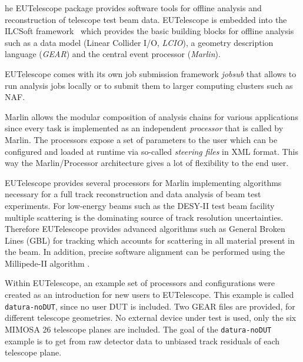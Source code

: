 

he EUTelescope package \cite{ref:eutelwebsite} provides software tools for offline analysis and reconstruction of telescope test beam data. 
EUTelescope is embedded into the ILCSoft framework~\cite{ref:eudetmemo_2009_12} which provides the basic building blocks for offline analysis such as a data model (Linear Collider I/O, \emph{LCIO}),
a geometry description language (\emph{GEAR}) and the central event processor (\emph{Marlin}).


EUTelescope comes with its own job submission framework \emph{jobsub} that allows to run analysis jobs locally or to submit them to larger computing clusters such as NAF.

Marlin allows the modular composition of analysis chains for various applications since every task is implemented as an independent \emph{processor} that is called by Marlin. 
The processors expose a set of parameters to the user which can be configured and loaded at runtime via so-called \emph{steering files} in XML format.
This way the Marlin/Processor architecture gives a lot of flexibility to the end user. 

EUTelescope provides several processors for Marlin implementing algorithms necessary for a full track reconstruction and data analysis of beam test experiments. 
For low-energy beams such as the DESY-II test beam facility multiple scattering is the dominating source of track resolution uncertainties. 
Therefore EUTelescope provides advanced algorithms such as General Broken Lines (GBL) \cite{Kleinwort-2012} for tracking which accounts for scattering in all material present in the beam. 
In addition, precise software alignment can be performed using the Millipede-II algorithm \cite{Blobel-2006}.

\label{sec:datura-nodut}
Within EUTelescope, an example set of processors and configurations were created as an introduction for new users to EUTelescope.
This example is called \texttt{datura-noDUT}, since no user DUT is included.
Two GEAR files are provided, for different telescope geometries.
No external device under test is used, only the six MIMOSA 26 telescope planes are included.
The goal of the \texttt{datura-noDUT} example is to get from raw detector data to unbiased track residuals of each telescope plane.

